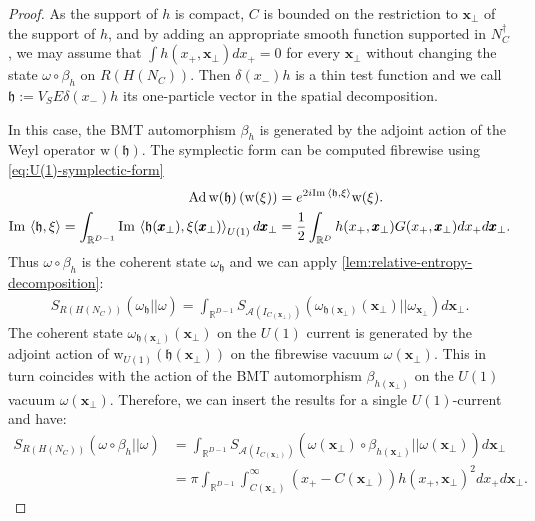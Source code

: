 \documentclass[12pt]{article}
\def\RR{{\mathbb R}}
\def\A{{\mathcal A}}
\def\b{\beta}
\def\Ad{{\hbox{\rm Ad\,}}}
\def\Im{\mathrm{Im}\,}
\def\im{\mathrm{Im}\,}
\def\tx{\pmb{x}}
\theoremstyle{remark}
\begin{document}
	\begin{proof}
		
    As the support of $h$ is compact, $C$ is bounded on the restriction to $\tx_\perp$ of the support of $h$,
    and by adding an appropriate smooth function supported in $N_C^\dagger$, we may assume that
    $\int h(x_+,\tx_\perp)dx_+=0$ for every $\tx_\perp$ without changing the state $\omega\circ \beta_h$ on $R(H(N_C))$. Then $\delta(x_-)h$ is a thin test function and we call $\mathfrak{h}:=V_SE\delta(x_-)h$ its one-particle vector in the spatial decomposition.
    
	In this case, the BMT automorphism $\beta_h$ is generated by the adjoint action of the Weyl operator $\mathrm w(\mathfrak{h})$. The symplectic form can be computed fibrewise using \eqref{eq:U(1)-symplectic-form}
			\begin{align}
				\Ad \mathrm w(\mathfrak{h}) \left(\mathrm w(\xi)\right)&=e^{2i \im \braket{\mathfrak{h},\xi}}\mathrm w(\xi).\label{eq:BMT auto}\\
				\Im \braket{\mathfrak{h},\xi}= \int_{\RR^{D-1}} \Im\braket{\mathfrak{h}(\tx_\perp),\xi(\tx_\perp)}_{U(1)}d\tx_\perp&=\frac{1}{2}\int_{\RR^{D}} h(x_+,\tx_\perp)G(x_+,\tx_\perp)dx_+d\tx_\perp\label{eq:symplectic-form}.
			\end{align}
		Thus $\omega \circ \b_h$ is the coherent state $\omega_{\mathfrak{h}}$ and we can apply \autoref{lem:relative-entropy-decomposition}:
			\begin{align*}
				S_{R(H(N_C))}(\omega_{\mathfrak{h}}||\omega)=\int_{\RR^{D-1}}S_{\A(I_{C(\tx_\perp)})}(\omega_{\mathfrak{h}(\tx_\perp)}(\tx_\perp)||\omega_{\tx_\perp})d\tx_\perp.
			\end{align*}
		The coherent state $\omega_{\mathfrak{h}(\tx_\perp)}(\tx_\perp)$ on the $U(1)$ current is generated by the adjoint action of $\mathrm w_{U(1)}(\mathfrak{h}(\tx_\perp))$ on the fibrewise vacuum $\omega(\tx_\perp)$. This in turn coincides with the action of the BMT automorphism $\b_{h(\tx_\perp)}$ on the $U(1)$ vacuum $\omega({\tx_\perp})$.
		Therefore, we can insert the results for a single $U(1)$-current and have:
			\begin{align*}
					S_{R(H(N_C))}(\omega \circ 		\beta_h||\omega)&=\int_{\RR^{D-1}}S_{\A(I_{C(\tx_\perp)})}(\omega({\tx_\perp}) \circ \beta_{h(\tx_\perp)}||\omega({\tx_\perp}))d\tx_\perp\\
					&=\pi\int_{\RR^{D-1}}\int_{C(\tx_\perp)}^\infty 		(x_+-C(\tx_\perp)) h(x_+,\tx_\perp)^2 dx_+ d\tx_\perp.
			\end{align*}
	\end{proof}
\end{document}
